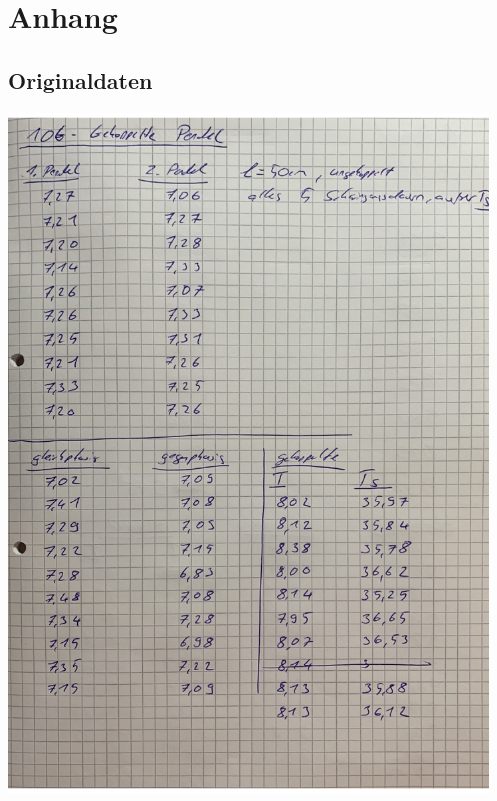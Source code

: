 \section{Anhang}
\label{sec:Anhang}
\subsection{Originaldaten}
\centering
\includegraphics[height=18cm]{content/Originaldaten/Originaldaten_1.pdf}
\newpage
\centering
